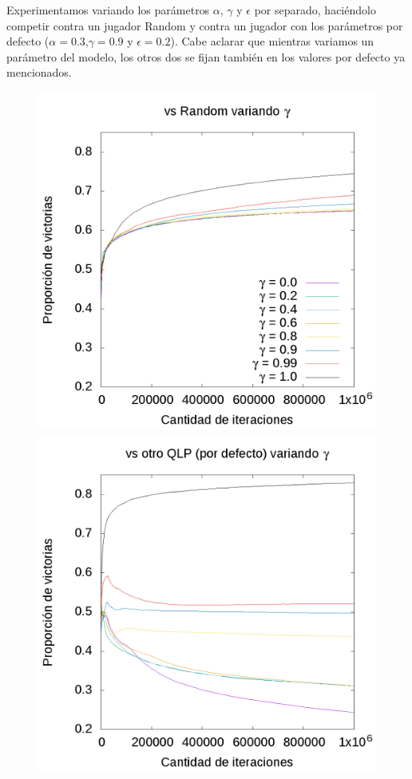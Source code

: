 \documentclass[10pt, a4paper]{article}
\begin{document}
Experimentamos variando los parámetros $\alpha$, $\gamma$ y $\epsilon$ por separado, haciéndolo competir contra un jugador Random y contra un jugador con los parámetros por defecto ($\alpha=0.3$,$\gamma=0.9$ y $\epsilon=0.2$).
Cabe aclarar que mientras variamos un parámetro del modelo, los otros dos se fijan también en los valores por defecto ya mencionados.


\begin{figure}[H]
 \centering
  \begin{minipage}[c]{1\textwidth}
	\includegraphics[scale=0.2]{GammaR.png}
	\includegraphics[scale=0.2]{GammaQ.png}

\end{minipage}
\end{figure}
\end{document}
